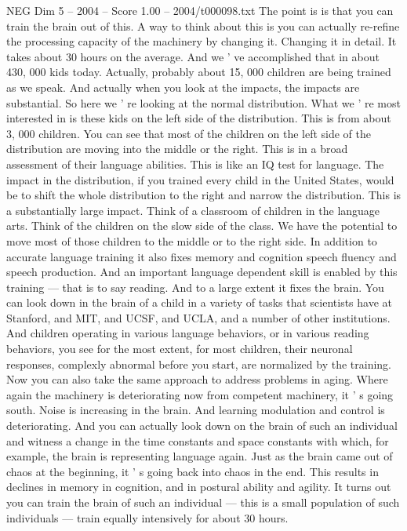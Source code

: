 \begin{textsample}{NEG Dim 5 – 2004 – Score 1.00 – 2004/t000098.txt}
The point is is that you can train the brain out of this.
A way to think about this is you can actually re-refine the processing capacity of the machinery by changing it.
Changing it in detail.
It takes about 30 hours on the average.
And we ' ve accomplished that in about 430, 000 kids today.
Actually, probably about 15, 000 children are being trained as we speak.
And actually when you look at the impacts, the impacts are substantial.
So here we ' re looking at the normal distribution.
What we ' re most interested in is these kids on the left side of the distribution.
This is from about 3, 000 children.
You can see that most of the children on the left side of the distribution are moving into the middle or the right.
This is in a broad assessment of their language abilities.
This is like an IQ test for language.
The impact in the distribution, if you trained every child in the United States, would be to shift the whole distribution to the right and narrow the distribution.
This is a substantially large impact.
Think of a classroom of children in the language arts.
Think of the children on the slow side of the class.
We have the potential to move most of those children to the middle or to the right side.
In addition to accurate language training it also fixes memory and cognition speech fluency and speech production.
And an important language dependent skill is enabled by this training — that is to say reading.
And to a large extent it fixes the brain.
You can look down in the brain of a child in a variety of tasks that scientists have at Stanford, and MIT, and UCSF, and UCLA, and a number of other institutions.
And children operating in various language behaviors, or in various reading behaviors, you see for the most extent, for most children, their neuronal responses, complexly abnormal before you start, are normalized by the training.
Now you can also take the same approach to address problems in aging.
Where again the machinery is deteriorating now from competent machinery, it ' s going south.
Noise is increasing in the brain.
And learning modulation and control is deteriorating.
And you can actually look down on the brain of such an individual and witness a change in the time constants and space constants with which, for example, the brain is representing language again.
Just as the brain came out of chaos at the beginning, it ' s going back into chaos in the end.
This results in declines in memory in cognition, and in postural ability and agility.
It turns out you can train the brain of such an individual — this is a small population of such individuals — train equally intensively for about 30 hours.

\end{textsample}
